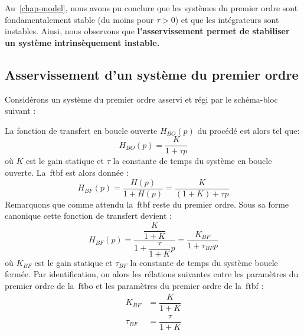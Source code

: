 Au~\cref{chap-model}, nous avons pu conclure que les systèmes du premier ordre 
sont fondamentalement stable (du moins pour $\tau>0$) et que les intégrateurs 
sont instables.
Ainsi, nous observons que \textbf{l'asservissement permet de stabiliser un 
système intrinsèquement instable.} 

\subsection{Asservissement d'un système du premier ordre}

Considérons un système du premier ordre asservi et régi par le schéma-bloc 
suivant :
\begin{center}
\end{center}
La fonction de transfert en boucle ouverte $H_{BO}(p)$ du procédé est alors 
tel que:
$$
H_{BO}(p)=\dfrac{K}{1+\tau p}
$$
où $K$ est le gain statique et $\tau$ la constante de temps 
du système en boucle ouverte. 
La~\gls{ftbf} est alors donnée :
$$
H_{BF}(p)=\dfrac{H(p)}{1+H(p)}=\dfrac{K}{(1+K)+\tau p}
$$
Remarquons que comme attendu la~\gls{ftbf} reste du premier ordre. 
Sous sa forme canonique cette fonction de transfert devient :
$$
H_{BF}(p)=\dfrac{\dfrac{K}{1+K}}{1+\dfrac{\tau}{1+K}p}
=\dfrac{K_{BF}}{1+\tau_{BF} p}
$$
où $K_{BF}$ est le gain statique et $\tau_{BF}$ la constante de temps du 
système boucle fermée. Par identification, on alors les rélations suivantes 
entre les paramètres du premier ordre de la~\gls{ftbo} et les paramètres du 
premier ordre de la~\gls{ftbf} :
\begin{align*}
       K_{BF}&=\dfrac{K}{1+K}\\
    \tau_{BF}&=\dfrac{\tau}{1+K}
\end{align*}

